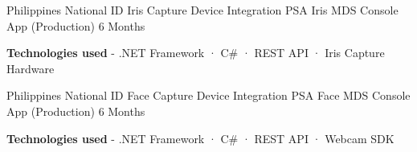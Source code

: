 
\begin{cventries}

  \cventry
    {Philippines National ID Iris Capture Device Integration} %
    {PSA Iris MDS} %
    {Console App (Production)} %
    {6 Months} %
    {
      \begin{cvitems} %
        \item {\textbf{Technologies used} \hspace{0.03cm} - \hspace{0.03cm} .NET Framework \hspace{0.03cm} · \hspace{0.03cm} C\# \hspace{0.03cm} · \hspace{0.03cm} REST API \hspace{0.03cm} · \hspace{0.03cm} Iris Capture Hardware \\}
      \end{cvitems}
    }
  \cventry
    {Philippines National ID Face Capture Device Integration} %
    {PSA Face MDS} %
    {Console App (Production)} %
    {6 Months} %
    {
      \begin{cvitems} %
        \item {\textbf{Technologies used} \hspace{0.03cm} - \hspace{0.03cm} .NET Framework \hspace{0.03cm} · \hspace{0.03cm} C\# \hspace{0.03cm} · \hspace{0.03cm} REST API \hspace{0.03cm} · \hspace{0.03cm} Webcam SDK \\}
      \end{cvitems}
    }

\end{cventries}
